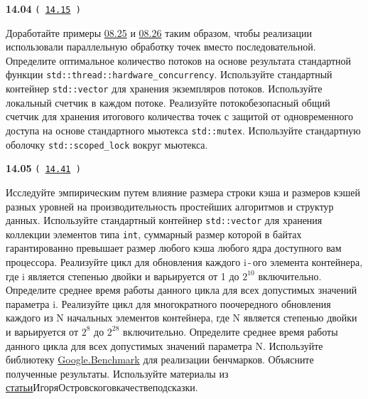 \documentclass[a4paper,12pt]{article}
\begin{document}
\bigskip

{\large \textbf{14.04} \texttt{(\,\href{https://github.com/i-s-m-mipt/Education/blob/master/projects/examples/source/14.15.cpp}{14.15}\,)}}

\bigskip

Доработайте примеры \href{https://github.com/i-s-m-mipt/Education/blob/master/projects/examples/source/08.25.cpp}{08.25} и \href{https://github.com/i-s-m-mipt/Education/blob/master/projects/examples/source/08.26.cpp}{08.26} таким образом, чтобы реализации использовали параллельную обработку точек вместо последовательной. Определите оптимальное количество потоков на основе результата стандартной функции \lstinline{std::thread::hardware_concurrency}. Используйте стандартный контейнер \lstinline{std::vector} для хранения экземпляров потоков. Используйте локальный счетчик в каждом потоке. Реализуйте потокобезопасный общий счетчик для хранения итогового количества точек с защитой от одновременного доступа на основе стандартного мьютекса \lstinline{std::mutex}. Используйте стандартную оболочку \lstinline{std::scoped_lock} вокруг мьютекса.

\bigskip

{\large \textbf{14.05} \texttt{(\,\href{https://github.com/i-s-m-mipt/Education/blob/master/projects/examples/source/14.41.cpp}{14.41}\,)}}

\bigskip

Исследуйте эмпирическим путем влияние размера строки кэша и размеров кэшей разных уровней на производительность простейших алгоритмов и структур данных. Используйте стандартный контейнер \lstinline{std::vector} для хранения коллекции элементов типа \lstinline{int}, суммарный размер которой в байтах гарантированно превышает размер любого кэша любого ядра доступного вам процессора. Реализуйте цикл для обновления каждого i\,-\,ого элемента контейнера, где i является степенью двойки и варьируется от 1 до $2^{10}$ включительно. Определите среднее время работы данного цикла для всех допустимых значений параметра i. Реализуйте цикл для многократного поочередного обновления каждого из N начальных элементов контейнера, где N является степенью двойки и варьируется от $2^{8}$ до $2^{28}$ включительно. Определите среднее время работы данного цикла для всех допустимых значений параметра N. Используйте библиотеку \href{https://github.com/google/benchmark}{Google.Benchmark} для реализации бенчмарков. Объясните полученные результаты. Используйте материалы из \href{https://igoro.com/archive/gallery-of-processor-cache-effects/}{статьи}\:Игоря\:Островского\:в\:качестве\:подсказки.
\end{document}
